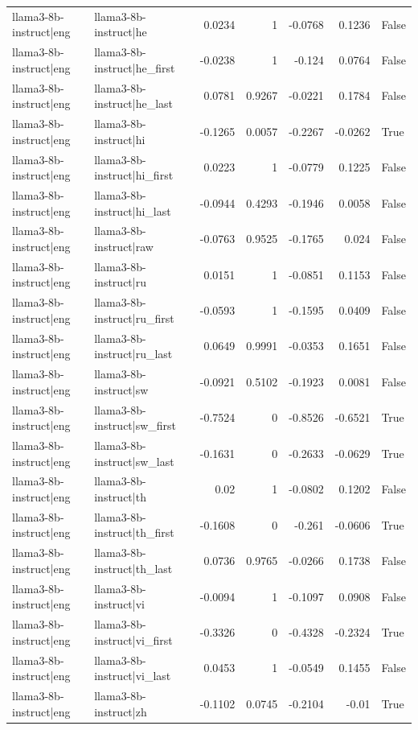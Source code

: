 \begin{table}
\begin{tabular}{l l r r r r l}
llama3-8b-instruct|eng & llama3-8b-instruct|he & 0.0234 & 1 & -0.0768 & 0.1236 & False \\
llama3-8b-instruct|eng & llama3-8b-instruct|he_first & -0.0238 & 1 & -0.124 & 0.0764 & False \\
llama3-8b-instruct|eng & llama3-8b-instruct|he_last & 0.0781 & 0.9267 & -0.0221 & 0.1784 & False \\
llama3-8b-instruct|eng & llama3-8b-instruct|hi & -0.1265 & 0.0057 & -0.2267 & -0.0262 & True \\
llama3-8b-instruct|eng & llama3-8b-instruct|hi_first & 0.0223 & 1 & -0.0779 & 0.1225 & False \\
llama3-8b-instruct|eng & llama3-8b-instruct|hi_last & -0.0944 & 0.4293 & -0.1946 & 0.0058 & False \\
llama3-8b-instruct|eng & llama3-8b-instruct|raw & -0.0763 & 0.9525 & -0.1765 & 0.024 & False \\
llama3-8b-instruct|eng & llama3-8b-instruct|ru & 0.0151 & 1 & -0.0851 & 0.1153 & False \\
llama3-8b-instruct|eng & llama3-8b-instruct|ru_first & -0.0593 & 1 & -0.1595 & 0.0409 & False \\
llama3-8b-instruct|eng & llama3-8b-instruct|ru_last & 0.0649 & 0.9991 & -0.0353 & 0.1651 & False \\
llama3-8b-instruct|eng & llama3-8b-instruct|sw & -0.0921 & 0.5102 & -0.1923 & 0.0081 & False \\
llama3-8b-instruct|eng & llama3-8b-instruct|sw_first & -0.7524 & 0 & -0.8526 & -0.6521 & True \\
llama3-8b-instruct|eng & llama3-8b-instruct|sw_last & -0.1631 & 0 & -0.2633 & -0.0629 & True \\
llama3-8b-instruct|eng & llama3-8b-instruct|th & 0.02 & 1 & -0.0802 & 0.1202 & False \\
llama3-8b-instruct|eng & llama3-8b-instruct|th_first & -0.1608 & 0 & -0.261 & -0.0606 & True \\
llama3-8b-instruct|eng & llama3-8b-instruct|th_last & 0.0736 & 0.9765 & -0.0266 & 0.1738 & False \\
llama3-8b-instruct|eng & llama3-8b-instruct|vi & -0.0094 & 1 & -0.1097 & 0.0908 & False \\
llama3-8b-instruct|eng & llama3-8b-instruct|vi_first & -0.3326 & 0 & -0.4328 & -0.2324 & True \\
llama3-8b-instruct|eng & llama3-8b-instruct|vi_last & 0.0453 & 1 & -0.0549 & 0.1455 & False \\
llama3-8b-instruct|eng & llama3-8b-instruct|zh & -0.1102 & 0.0745 & -0.2104 & -0.01 & True \\

\end{tabular}
\end{table}
